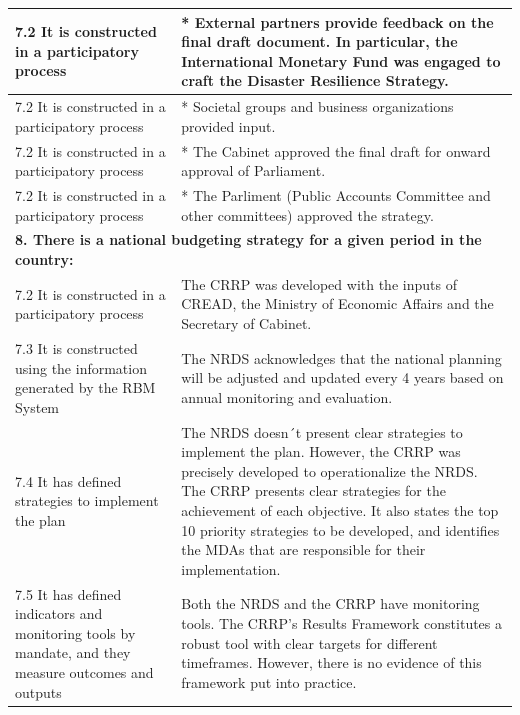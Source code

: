\documentclass[
  10pt,
]{book}
\begin{document}
\begin{table}
\begin{tabular}[t]{l|l}
\hline
\hspace{1em}7.2 It is constructed in a participatory process & * External partners provide feedback on the final draft document. In particular, the International Monetary Fund was engaged to craft the Disaster Resilience Strategy.\\
\hline
\hspace{1em}7.2 It is constructed in a participatory process & * Societal groups and business organizations provided input.\\
\hline
\hspace{1em}7.2 It is constructed in a participatory process & * The Cabinet approved the final draft for onward approval of Parliament.\\
\hline
\hspace{1em}7.2 It is constructed in a participatory process & * The Parliment (Public Accounts Committee and other committees) approved the strategy.\\
\hline
\multicolumn{2}{l}{\textbf{8. There is a national budgeting strategy for a given period in the country:}}\\
\hline
\hspace{1em}7.2 It is constructed in a participatory process & The CRRP was developed with the inputs of CREAD, the Ministry of Economic Affairs and the Secretary of Cabinet.\\
\hline
\hspace{1em}7.3 It is constructed using the information generated by the RBM System & The NRDS acknowledges that the national planning will be adjusted and updated every 4 years based on annual monitoring and evaluation.\\
\hline
\hspace{1em}7.4 It has defined strategies to implement the plan & The NRDS doesn´t present clear strategies to implement the plan. However, the CRRP was precisely developed to operationalize the NRDS. The CRRP presents clear strategies for the achievement of each objective. It also states the top 10 priority strategies to be developed, and identifies the MDAs that are responsible for their implementation.\\
\hline
\hspace{1em}7.5 It has defined indicators and monitoring tools by mandate, and they measure outcomes and outputs & Both the NRDS and the CRRP have monitoring tools. The CRRP’s Results Framework constitutes a robust tool with clear targets for different timeframes. However, there is no evidence of  this framework put into practice.\\

\end{tabular}
\end{table}
\end{document}
